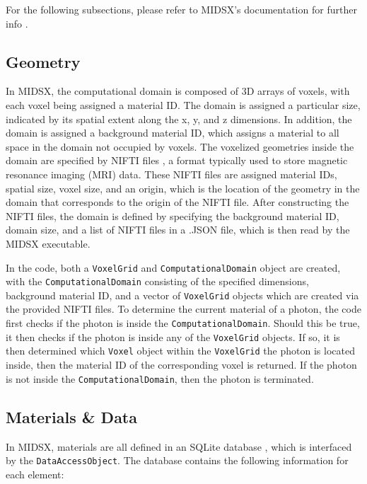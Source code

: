 For the following subsections, please refer to MIDSX's documentation for further info \cite{MIDSXDOC2023}.

\subsection{Geometry}
\par In MIDSX, the computational domain is composed of 3D arrays of voxels, with each voxel being assigned a material ID. The domain is assigned a particular size, indicated by its spatial extent along the x, y, and z dimensions. In addition, the domain is assigned a background material ID, which assigns a material to all space in the domain not occupied by voxels. The voxelized geometries inside the domain are specified by NIFTI files \cite{nifti2004}, a format typically used to store magnetic resonance imaging (MRI) data. These NIFTI files are assigned material IDs, spatial size, voxel size, and an origin, which is the location of the geometry in the domain that corresponds to the origin of the NIFTI file. After constructing the NIFTI files, the domain is defined by specifying the background material ID, domain size, and a list of NIFTI files in a .JSON file, which is then read by the MIDSX executable.
\par In the code, both a \texttt{VoxelGrid} and \texttt{ComputationalDomain} object are created, with the \texttt{ComputationalDomain} consisting of the specified dimensions, background material ID, and a vector of \texttt{VoxelGrid} objects which are created via the provided NIFTI files. To determine the current material of a photon, the code first checks if the photon is inside the \texttt{ComputationalDomain}. Should this be true, it then checks if the photon is inside any of the \texttt{VoxelGrid} objects. If so, it is then determined which \texttt{Voxel} object within the \texttt{VoxelGrid} the photon is located inside, then the material ID of the corresponding voxel is returned. If the photon is not inside the \texttt{ComputationalDomain}, then the photon is terminated.

\subsection{Materials \& Data}
\par In MIDSX, materials are all defined in an SQLite database \cite{sqlite2020hipp}, which is interfaced by the \texttt{DataAccessObject}. The database contains the following information for each element:

